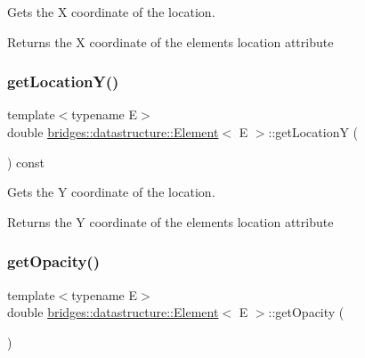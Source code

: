 Gets the X coordinate of the location. 

\begin{DoxyReturn}{Returns}
the X coordinate of the element\textquotesingle{}s location attribute 
\end{DoxyReturn}
\mbox{\label{classbridges_1_1datastructure_1_1_element_a6394039086bc1f27f2e6adf73294a74b}} 
\subsubsection{\texorpdfstring{get\+Location\+Y()}{getLocationY()}}
{\footnotesize\ttfamily template$<$typename E$>$ \\
double \hyperlink{classbridges_1_1datastructure_1_1_element}{bridges\+::datastructure\+::\+Element}$<$ E $>$\+::get\+LocationY (\begin{DoxyParamCaption}{ }\end{DoxyParamCaption}) const\hspace{0.3cm}{\ttfamily [inline]}}



Gets the Y coordinate of the location. 

\begin{DoxyReturn}{Returns}
the Y coordinate of the element\textquotesingle{}s location attribute 
\end{DoxyReturn}
\mbox{\label{classbridges_1_1datastructure_1_1_element_acf14bfc12da42565b237a7bd79bd36c2}} 
\subsubsection{\texorpdfstring{get\+Opacity()}{getOpacity()}}
{\footnotesize\ttfamily template$<$typename E$>$ \\
double \hyperlink{classbridges_1_1datastructure_1_1_element}{bridges\+::datastructure\+::\+Element}$<$ E $>$\+::get\+Opacity (\begin{DoxyParamCaption}{ }\end{DoxyParamCaption})\hspace{0.3cm}{\ttfamily [inline]}}

